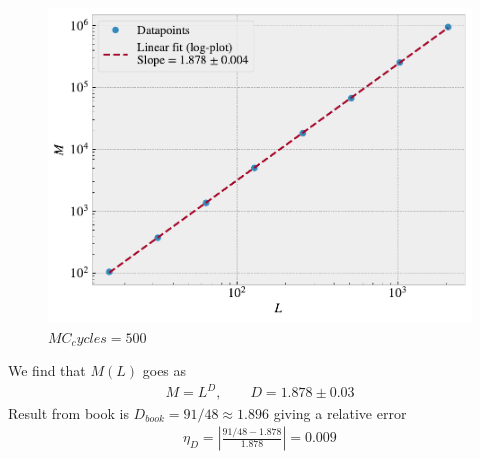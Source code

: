 \documentclass[reprint, amsmath, amssymb, aps]{revtex4-2}
\begin{document}
\begin{figure}[H]
  \includegraphics[width=\linewidth]{figures/i.pdf}
  \caption{$MC_cycles = 500$}
  \label{fig:i}
\end{figure}
We find that $M(L)$ goes as
\begin{align*}
  M = L^D, \qquad D = 1.878 \pm 0.03
\end{align*}
Result from book is $D_{book} = 91/48 \approx 1.896$ giving a relative error
\begin{align*}
  \eta_D= \left|\frac{91/48 - 1.878}{1.878}\right| = 0.009
\end{align*}




\begin{thebibliography}{9}
\end{thebibliography}
\end{document}
